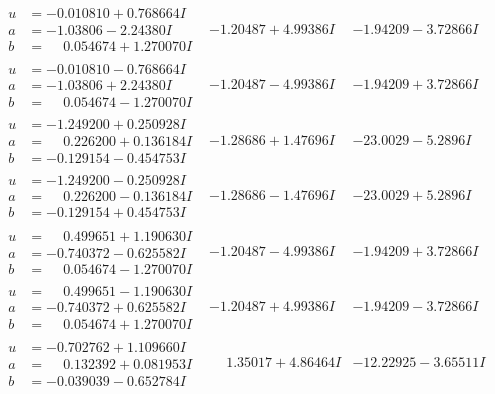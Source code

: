 \documentclass[1p]{elsarticle_modified}
\theoremstyle{definition}
\begin{document}
$$\begin{array}{c|c|c}
\begin{aligned}
u &= -0.010810 + 0.768664 I \\
a &= -1.03806 - 2.24380 I \\
b &= \phantom{-}0.054674 + 1.270070 I\end{aligned}
 & -1.20487 + 4.99386 I & -1.94209 - 3.72866 I \\ \hline\begin{aligned}
u &= -0.010810 - 0.768664 I \\
a &= -1.03806 + 2.24380 I \\
b &= \phantom{-}0.054674 - 1.270070 I\end{aligned}
 & -1.20487 - 4.99386 I & -1.94209 + 3.72866 I \\ \hline\begin{aligned}
u &= -1.249200 + 0.250928 I \\
a &= \phantom{-}0.226200 + 0.136184 I \\
b &= -0.129154 - 0.454753 I\end{aligned}
 & -1.28686 + 1.47696 I & -23.0029 - 5.2896 I \\ \hline\begin{aligned}
u &= -1.249200 - 0.250928 I \\
a &= \phantom{-}0.226200 - 0.136184 I \\
b &= -0.129154 + 0.454753 I\end{aligned}
 & -1.28686 - 1.47696 I & -23.0029 + 5.2896 I \\ \hline\begin{aligned}
u &= \phantom{-}0.499651 + 1.190630 I \\
a &= -0.740372 - 0.625582 I \\
b &= \phantom{-}0.054674 - 1.270070 I\end{aligned}
 & -1.20487 - 4.99386 I & -1.94209 + 3.72866 I \\ \hline\begin{aligned}
u &= \phantom{-}0.499651 - 1.190630 I \\
a &= -0.740372 + 0.625582 I \\
b &= \phantom{-}0.054674 + 1.270070 I\end{aligned}
 & -1.20487 + 4.99386 I & -1.94209 - 3.72866 I \\ \hline\begin{aligned}
u &= -0.702762 + 1.109660 I \\
a &= \phantom{-}0.132392 + 0.081953 I \\
b &= -0.039039 - 0.652784 I\end{aligned}
 & \phantom{-}1.35017 + 4.86464 I & -12.22925 - 3.65511 I \\ \hline\begin{aligned}

\end{aligned}
\end{array}$$
\end{document}
